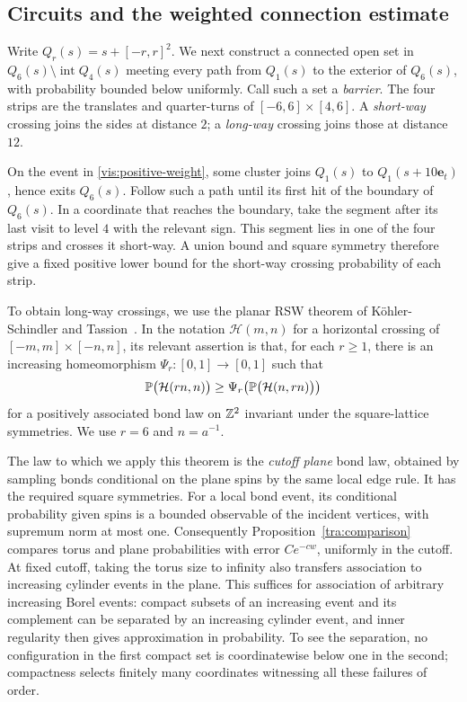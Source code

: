 \subsection{Circuits and the weighted connection estimate}

Write $Q_r(s)=s+[-r,r]^2$.  We next construct a connected open set
in $Q_6(s)\setminus\operatorname{int}Q_4(s)$ meeting every path from
$Q_1(s)$ to the exterior of $Q_6(s)$, with probability bounded below
uniformly.  Call such a set a \emph{barrier}.
The four strips are the translates and
quarter-turns of $[-6,6]\times[4,6]$.  A \emph{short-way} crossing
joins the sides at distance $2$; a \emph{long-way} crossing joins those
at distance $12$.

On the event in \eqref{vis:positive-weight}, some cluster joins
$Q_1(s)$ to $Q_1(s+10\mathbf e_t)$, hence exits $Q_6(s)$.
Follow such a path until its first hit of the boundary of $Q_6(s)$.
In a coordinate that reaches the boundary,
take the segment after its last visit to level $4$ with the relevant
sign.  This segment lies in one of the four strips and crosses it
short-way.  A union bound and square symmetry therefore give a fixed
positive lower bound for the short-way crossing probability of each
strip.

To obtain long-way crossings, we use the planar RSW theorem of
K\"ohler-Schindler and Tassion~\cite[Theorem~1, preprint version]{KohlerSchindlerTassion2023}.
In the notation $\mathcal H(m,n)$ for a horizontal crossing of
$[-m,m]\times[-n,n]$, its relevant assertion is that, for each
$r\ge1$, there is an increasing homeomorphism
$\Psi_r:[0,1]\to[0,1]$ such that
\begin{equation}\label{vis:rsw}
 \mathbb P\bigl(\mathcal H(rn,n)\bigr)
 \ge\Psi_r\!\left(\mathbb P\bigl(\mathcal H(n,rn)\bigr)\right)
\end{equation}
for a positively associated bond law on $\mathbb Z^2$ invariant under the
square-lattice symmetries.  We use $r=6$ and $n=a^{-1}$.

The law to which we apply this theorem is the \emph{cutoff plane} bond
law, obtained by sampling bonds conditional on the plane spins by the
same local edge rule.  It has the required square symmetries.
For a local bond event, its conditional probability given spins is a
bounded observable of the incident vertices, with supremum norm at
most one.  Consequently Proposition~\ref{tra:comparison} compares torus and
plane probabilities with error $Ce^{-cw}$, uniformly in the cutoff.
At fixed cutoff, taking the torus size to infinity also transfers
association to increasing cylinder events in the plane.
This suffices for association of arbitrary increasing Borel events:
compact subsets of an increasing event and its complement can be
separated by an increasing cylinder event, and inner regularity then
gives approximation in probability.  To see the separation, no
configuration in the first compact set is coordinatewise below one
in the second; compactness selects finitely many coordinates witnessing
all these failures of order.

